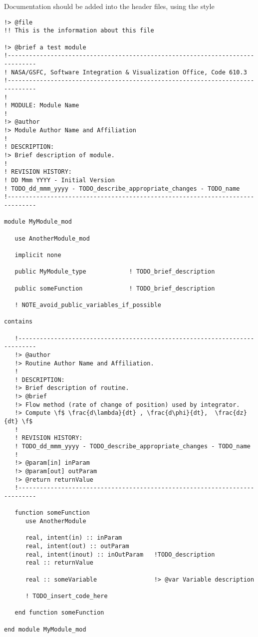 Documentation should be added into the header files, using the style
\begin{verbatim}
!> @file
!! This is the information about this file

!> @brief a test module
!------------------------------------------------------------------------------
! NASA/GSFC, Software Integration & Visualization Office, Code 610.3
!------------------------------------------------------------------------------
!
! MODULE: Module Name
!
!> @author
!> Module Author Name and Affiliation
!
! DESCRIPTION: 
!> Brief description of module.
!
! REVISION HISTORY:
! DD Mmm YYYY - Initial Version
! TODO_dd_mmm_yyyy - TODO_describe_appropriate_changes - TODO_name
!------------------------------------------------------------------------------

module MyModule_mod
   
   use AnotherModule_mod
   
   implicit none
   
   public MyModule_type            ! TODO_brief_description
 
   public someFunction             ! TODO_brief_description
   
   ! NOTE_avoid_public_variables_if_possible
   
contains
 
   !---------------------------------------------------------------------------  
   !> @author 
   !> Routine Author Name and Affiliation.
   !
   ! DESCRIPTION: 
   !> Brief description of routine. 
   !> @brief
   !> Flow method (rate of change of position) used by integrator.
   !> Compute \f$ \frac{d\lambda}{dt} , \frac{d\phi}{dt},  \frac{dz}{dt} \f$
   !
   ! REVISION HISTORY:
   ! TODO_dd_mmm_yyyy - TODO_describe_appropriate_changes - TODO_name
   !
   !> @param[in] inParam      
   !> @param[out] outParam      
   !> @return returnValue
   !---------------------------------------------------------------------------  
   
   function someFunction
      use AnotherModule  
      
      real, intent(in) :: inParam        
      real, intent(out) :: outParam       
      real, intent(inout) :: inOutParam   !TODO_description
      real :: returnValue                 
      
      real :: someVariable                !> @var Variable description
 
      ! TODO_insert_code_here
 
   end function someFunction
   
end module MyModule_mod
\end{verbatim}

